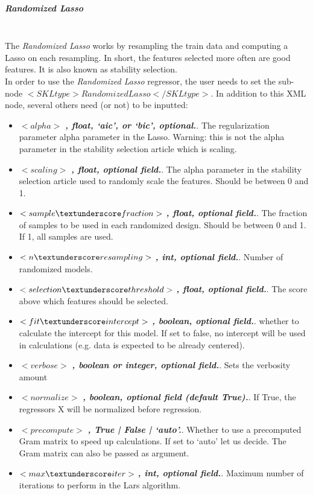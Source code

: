 \subparagraph{Randomized Lasso}
\mbox{}
\\The \textit{Randomized Lasso} works by resampling the train data and computing a Lasso on each resampling. In short, the features selected more often are good features. It is also known as stability selection. 
\\In order to use the \textit{Randomized Lasso} regressor, the user needs to set the sub-node $<SKLtype>RandomizedLasso</SKLtype>$.
In addition to this XML node, several others need (or not) to be inputted:
\begin{itemize}
  \item $<alpha>$ \textbf{\textit{, float, ‘aic’, or ‘bic’, optional.}}. The regularization parameter alpha parameter in the Lasso. Warning: this is not the alpha parameter in the stability selection article which is scaling.
  \item $<scaling>$ \textbf{\textit{, float, optional field.}}. The alpha parameter in the stability selection article used to randomly scale the features. Should be between 0 and 1. 
  \item $<sample\textunderscore fraction>$ \textbf{\textit{, float, optional field.}}. The fraction of samples to be used in each randomized design. Should be between 0 and 1. If 1, all samples are used.
  \item $<n\textunderscore resampling>$ \textbf{\textit{, int, optional field.}}. Number of randomized models.
  \item $<selection\textunderscore threshold>$ \textbf{\textit{, float, optional field.}}. The score above which features should be selected.
  \item $<fit\textunderscore intercept>$ \textbf{\textit{, boolean, optional field.}}. whether to calculate the intercept for this model. If set to false, no intercept will be used in calculations (e.g. data is expected to be already centered).
  \item $<verbose>$ \textbf{\textit{, boolean or integer, optional field.}}. Sets the verbosity amount
  \item $<normalize>$ \textbf{\textit{, boolean, optional field (default True).}}. If True, the regressors X will be normalized before regression.
  \item $<precompute>$ \textbf{\textit{, True | False | ‘auto’.}}. Whether to use a precomputed Gram matrix to speed up calculations. If set to ‘auto’ let us decide. The Gram matrix can also be passed as argument.
  \item $<max\textunderscore iter>$ \textbf{\textit{, int, optional field.}}. Maximum number of iterations to perform in the Lars algorithm.

\end{itemize}
